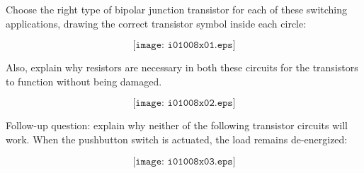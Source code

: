 

Choose the right type of bipolar junction transistor for each of these switching applications, drawing the correct transistor symbol inside each circle:

$$\texttt{[image: i01008x01.eps]}$$

Also, explain why resistors are necessary in both these circuits for the transistors to function without being damaged.







$$\texttt{[image: i01008x02.eps]}$$

\vskip 10pt

Follow-up question: explain why neither of the following transistor circuits will work.  When the pushbutton switch is actuated, the load remains de-energized:

$$\texttt{[image: i01008x03.eps]}$$











